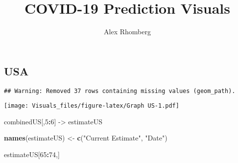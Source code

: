 \documentclass[]{article}
\title{COVID-19 Prediction Visuals}
\author{Alex Rhomberg}
\date{}
\newenvironment{Shaded}{\begin{snugshade}}{\end{snugshade}}
\newcommand{\DataTypeTok}[1]{\textcolor[rgb]{0.13,0.29,0.53}{#1}}
\newcommand{\DecValTok}[1]{\textcolor[rgb]{0.00,0.00,0.81}{#1}}
\newcommand{\FloatTok}[1]{\textcolor[rgb]{0.00,0.00,0.81}{#1}}
\newcommand{\KeywordTok}[1]{\textcolor[rgb]{0.13,0.29,0.53}{\textbf{#1}}}
\newcommand{\NormalTok}[1]{#1}
\newcommand{\OperatorTok}[1]{\textcolor[rgb]{0.81,0.36,0.00}{\textbf{#1}}}
\newcommand{\StringTok}[1]{\textcolor[rgb]{0.31,0.60,0.02}{#1}}
\begin{document}
\maketitle

\hypertarget{usa}{%
\subsection{USA}\label{usa}}

\begin{Shaded}
\end{Shaded}

\begin{verbatim}
## Warning: Removed 37 rows containing missing values (geom_path).
\end{verbatim}

\texttt{[image: Visuals\_files/figure-latex/Graph US-1.pdf]}

\begin{Shaded}
\begin{Highlighting}[]
\NormalTok{combinedUS[,}\DecValTok{5}\OperatorTok{:}\DecValTok{6}\NormalTok{] ->}\StringTok{ }\NormalTok{estimateUS}

\KeywordTok{names}\NormalTok{(estimateUS) <-}\StringTok{ }\KeywordTok{c}\NormalTok{(}\StringTok{"Current Estimate"}\NormalTok{, }\StringTok{"Date"}\NormalTok{)}

\NormalTok{estimateUS[}\DecValTok{65}\OperatorTok{:}\DecValTok{74}\NormalTok{,]}
\end{Highlighting}
\end{Shaded}
\end{document}
